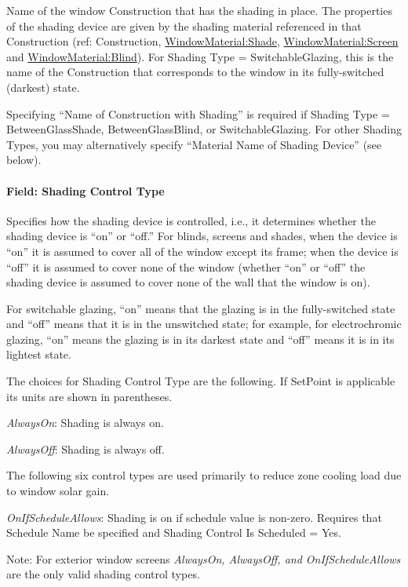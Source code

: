 Name of the window Construction that has the shading in place. The properties of the shading device are given by the shading material referenced in that Construction (ref: Construction, \hyperref[windowmaterialshade]{WindowMaterial:Shade}, \hyperref[windowmaterialscreen]{WindowMaterial:Screen} and \hyperref[windowmaterialblind]{WindowMaterial:Blind}). For Shading Type = SwitchableGlazing, this is the name of the Construction that corresponds to the window in its fully-switched (darkest) state.

Specifying ``Name of Construction with Shading'' is required if Shading Type = BetweenGlassShade, BetweenGlassBlind, or SwitchableGlazing. For other Shading Types, you may alternatively specify ``Material Name of Shading Device'' (see below).

\paragraph{Field: Shading Control Type}\label{field-shading-control-type}

Specifies how the shading device is controlled, i.e., it determines whether the shading device is ``on'' or ``off.'' For blinds, screens and shades, when the device is ``on'' it is assumed to cover all of the window except its frame; when the device is ``off'' it is assumed to cover none of the window (whether ``on'' or ``off'' the shading device is assumed to cover none of the wall that the window is on).

For switchable glazing, ``on'' means that the glazing is in the fully-switched state and ``off'' means that it is in the unswitched state; for example, for electrochromic glazing, ``on'' means the glazing is in its darkest state and ``off'' means it is in its lightest state.

The choices for Shading Control Type are the following. If SetPoint is applicable its units are shown in parentheses.

\emph{AlwaysOn}: Shading is always on.

\emph{AlwaysOff}: Shading is always off.

The following six control types are used primarily to reduce zone cooling load due to window solar gain.

\emph{OnIfScheduleAllows}: Shading is on if schedule value is non-zero. Requires that Schedule Name be specified and Shading Control Is Scheduled = Yes.

Note: For exterior window screens \emph{AlwaysOn, AlwaysOff, and OnIfScheduleAllows} are the only valid shading control types.

